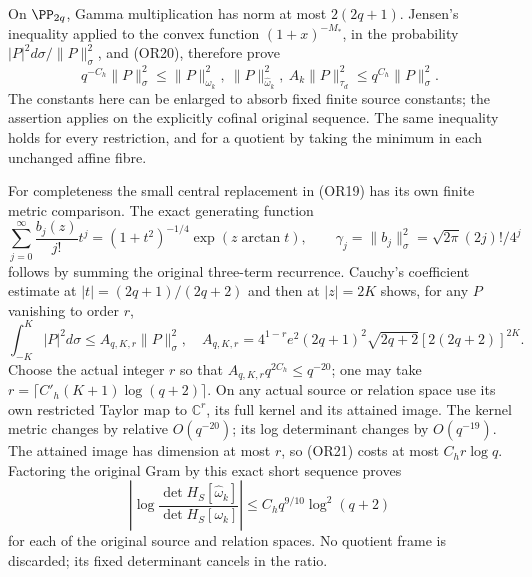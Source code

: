 On \(\PP_{2q}\), Gamma multiplication has norm at most \(2(2q+1)\).
Jensen's inequality applied to the convex function
\((1+x)^{-M_*}\), in the probability
\(|P|^2d\sigma/\|P\|_\sigma^2\), and (OR20), therefore prove
\[
 q^{-C_h}\|P\|_\sigma^2\leq
 \|P\|_{\omega_k}^2,\ \|P\|_{\widehat\omega_k}^2,\
 A_k\|P\|_{\tau_d}^2
 \leq q^{C_h}\|P\|_\sigma^2 .                        \tag{OR21}
\]
The constants here can be enlarged to absorb fixed finite source
constants; the assertion applies on the explicitly cofinal original
sequence.  The same inequality holds for every restriction, and
for a quotient by taking the minimum in each unchanged affine
fibre.

For completeness the small central replacement in (OR19) has its
own finite metric comparison.  The exact generating function
\[
 \sum_{j=0}^\infty\frac{b_j(z)}{j!}t^j
 =(1+t^2)^{-1/4}\exp(z\arctan t),\qquad
 \gamma_j=\|b_j\|_\sigma^2=\sqrt{2\pi}(2j)!/4^j
\]
follows by summing the original three-term recurrence.
Cauchy's coefficient estimate at \(|t|=(2q+1)/(2q+2)\)
and then at \(|z|=2K\) shows, for any \(P\) vanishing to order \(r\),
\[
 \int_{-K}^K|P|^2d\sigma
 \leq A_{q,K,r}\|P\|_\sigma^2,\quad
 A_{q,K,r}=4^{1-r}e^2(2q+1)^2\sqrt{2q+2}
                    [2(2q+2)]^{2K}.                \tag{OR22}
\]
Choose the actual integer \(r\) so that
\(A_{q,K,r}q^{2C_h}\leq q^{-20}\); one may take
\(r=\lceil C'_h(K+1)\log(q+2)\rceil\).
On any actual source or relation space use its own restricted
Taylor map to \(\mathbb C^r\), its full kernel and its attained
image.  The kernel metric changes by relative \(O(q^{-20})\);
its log determinant changes by \(O(q^{-19})\).
The attained image has dimension at most \(r\), so (OR21) costs
at most \(C_h r\log q\).  Factoring the original Gram by this
exact short sequence proves
\[
 \left|\log\frac{\det H_S[\widehat\omega_k]}
                        {\det H_S[\omega_k]}\right|
 \leq C_h q^{9/10}\log^2(q+2)                       \tag{OR23}
\]
for each of the original source and relation spaces.
No quotient frame is discarded; its fixed determinant cancels in
the ratio.

